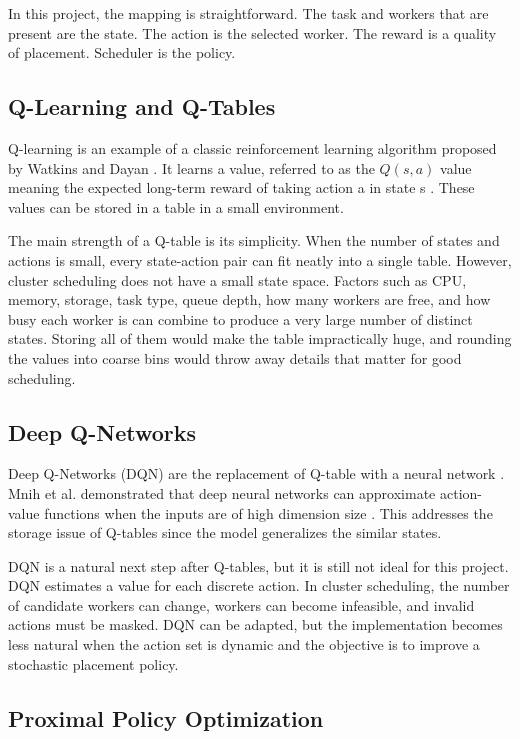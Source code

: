 In this project, the mapping is straightforward. The task and workers that are present are the state. The action is the selected worker. The reward is a quality of placement. Scheduler is the policy.

\subsection{Q-Learning and Q-Tables}

Q-learning is an example of a classic reinforcement learning algorithm proposed by Watkins and Dayan \cite{watkins1992qlearning}. It learns a value, referred to as the \(Q(s,a)\) value meaning the expected long-term reward of taking action a in state s \cite{watkins1992qlearning}. These values can be stored in a table in a small environment.

The main strength of a Q-table is its simplicity. When the number of states and actions is small, every state-action pair can fit neatly into a single table. However, cluster scheduling does not have a small state space. Factors such as CPU, memory, storage, task type, queue depth, how many workers are free, and how busy each worker is can combine to produce a very large number of distinct states. Storing all of them would make the table impractically huge, and rounding the values into coarse bins would throw away details that matter for good scheduling.

\subsection{Deep Q-Networks}

Deep Q-Networks (DQN) are the replacement of Q-table with a neural network \cite{mnih2013dqn}. Mnih et al. demonstrated that deep neural networks can approximate action-value functions when the inputs are of high dimension size \cite{mnih2013dqn}. This addresses the storage issue of Q-tables since the model generalizes the similar states.

DQN is a natural next step after Q-tables, but it is still not ideal for this project. DQN estimates a value for each discrete action. In cluster scheduling, the number of candidate workers can change, workers can become infeasible, and invalid actions must be masked. DQN can be adapted, but the implementation becomes less natural when the action set is dynamic and the objective is to improve a stochastic placement policy.

\subsection{Proximal Policy Optimization}

